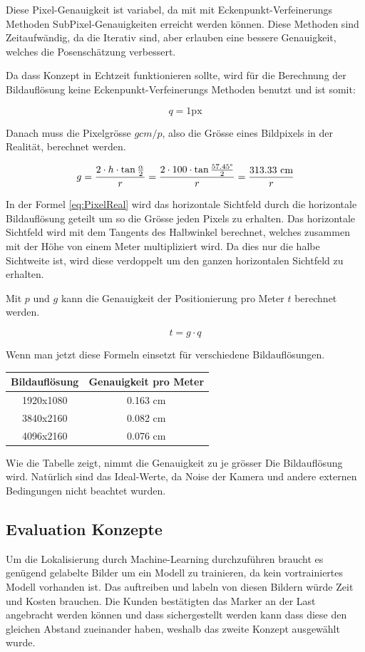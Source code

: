 Diese Pixel-Genauigkeit ist variabel, da mit mit Eckenpunkt-Verfeinerungs Methoden SubPixel-Genauigkeiten erreicht werden können.
Diese Methoden sind Zeitaufwändig, da die Iterativ sind, aber erlauben eine bessere Genauigkeit, welches die Posenschätzung verbessert.

Da dass Konzept in Echtzeit funktionieren sollte, wird für die Berechnung der Bildauflösung keine Eckenpunkt-Verfeinerungs Methoden benutzt und ist somit:

\[
q = 1\text{px}
\]

Danach muss die Pixelgrösse \(g cm/p\), also die Grösse eines Bildpixels in der Realität, berechnet werden.

\begin{equation}
g = \frac{2 \cdot h \cdot \tan\frac{\alpha}{2}}{r} = \frac{2 \cdot 100 \cdot \tan\frac{57.45\degree}{2}}{r} = \frac{313.33\text{ cm}}{r}
\label{eq:PixelReal}
\end{equation}

In der Formel \ref{eq:PixelReal} wird das horizontale Sichtfeld durch die horizontale Bildauflösung geteilt um so die Grösse jeden Pixels zu erhalten.
Das horizontale Sichtfeld wird mit dem Tangents des Halbwinkel berechnet, welches zusammen mit der Höhe von einem Meter multipliziert wird.
Da dies nur die halbe Sichtweite ist, wird diese verdoppelt um den ganzen horizontalen Sichtfeld zu erhalten.

Mit \(p\) und \(g\) kann die Genauigkeit der Positionierung pro Meter \(t\)  berechnet werden.

\begin{equation}
t = g \cdot q
\label{eq:precision}
\end{equation}

Wenn man jetzt diese Formeln einsetzt für verschiedene Bildauflösungen.

\begin{center}
    \begin{tabular}{ c c}
    \label{tab:resolutions}
     Bildauflösung & Genauigkeit pro Meter\\ 
     \hline
     1920x1080 & 0.163 cm \\  
     3840x2160 & 0.082 cm \\
     4096x2160 & 0.076 cm \\ 
\end{tabular}
\end{center}

Wie die Tabelle zeigt, nimmt die Genauigkeit zu je grösser Die Bildauflösung wird. 
Natürlich sind das Ideal-Werte, da Noise der Kamera und andere externen Bedingungen nicht beachtet wurden. 

\subsection{Evaluation Konzepte}
Um die Lokalisierung durch Machine-Learning durchzuführen braucht es genügend gelabelte Bilder um ein Modell zu trainieren, da kein vortrainiertes Modell vorhanden ist. Das auftreiben und labeln von diesen Bildern würde Zeit und Kosten brauchen. Die Kunden bestätigten das Marker an der Last angebracht werden können und dass sichergestellt werden kann dass diese den gleichen Abstand zueinander haben, weshalb das zweite Konzept ausgewählt wurde.
